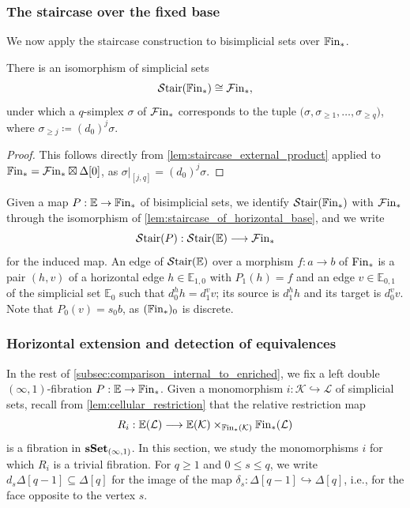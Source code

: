 \documentclass[10pt,reqno]{amsart}
\begin{document}
\subsubsection{The staircase over the fixed base}

We now apply the staircase construction to bisimplicial sets over
$\mathbb{F}\mathrm{in}_*$.

\begin{lemma}
\label{lem:staircase_of_horizontal_base}
There is an isomorphism of simplicial sets
\[
\mathcal{S}\mathrm{tair}(\mathbb{F}\mathrm{in}_*)\cong \mathcal{F}\mathrm{in}_*,
\]
under which a $q$-simplex $\sigma$ of $\mathcal{F}\mathrm{in}_*$ corresponds to
the tuple
$
\bigl(
\sigma,\sigma_{\geq1},\ldots,\sigma_{\geq q}
\bigr)
$,
where $\sigma_{\geq j}\coloneqq(d_0)^j\sigma$.
\end{lemma}

\begin{proof}
This follows directly from \cref{lem:staircase_external_product}
applied to $\mathbb{F}\mathrm{in}_*=\mathcal{F}\mathrm{in}_*\boxtimes\Delta[0]$, as
$\sigma|_{[j,q]}=(d_0)^j\sigma$.
\end{proof}

Given a map $P:\mathbb E\to\mathbb{F}\mathrm{in}_*$ of bisimplicial sets, we
identify $\mathcal{S}\mathrm{tair}(\mathbb{F}\mathrm{in}_*)$ with $\mathcal{F}\mathrm{in}_*$ through the isomorphism
of \cref{lem:staircase_of_horizontal_base}, and we write
\[
\mathcal{S}\mathrm{tair}(P):\mathcal{S}\mathrm{tair}(\mathbb E)\longrightarrow \mathcal{F}\mathrm{in}_*
\]
for the induced map. An edge of $\mathcal{S}\mathrm{tair}(\mathbb E)$ over a morphism
$f:a\to b$ of $\mathrm{Fin}_*$ is a pair $(h,v)$ of a horizontal edge
$h\in\mathbb E_{1,0}$ with $P_1(h)=f$ and an edge
$v\in\mathbb E_{0,1}$ of the simplicial set $\mathbb E_0$ such
that $d_0^hh=d_1^vv$; its source is $d_1^hh$ and its target is
$d_0^vv$. Note that $P_0(v)=s_0b$, as $(\mathbb{F}\mathrm{in}_*)_0$ is
discrete.


\subsubsection{Horizontal extension and detection of equivalences}
\label{subsubsec:horizontal_left_extension_converse}

In the rest of \cref{subsec:comparison_internal_to_enriched}, we fix a
left double $(\infty,1)$-fibration $P:\mathbb E\to\mathbb{F}\mathrm{in}_*$. Given
a monomorphism
$i:\mathcal K\hookrightarrow \mathcal L$ of simplicial sets, recall
from \cref{lem:cellular_restriction} that the relative restriction map
\[
R_i:
\mathbb E(\mathcal L)
\longrightarrow
\mathbb E(\mathcal K)\times_{\mathbb{F}\mathrm{in}_*(\mathcal K)}\mathbb{F}\mathrm{in}_*(\mathcal L)
\]
is a fibration in $\mathbf{sSet}_{(\infty,1)}$. In this section, we study
the monomorphisms $i$ for which $R_i$ is a trivial fibration. For
$q\geq1$ and $0\leq s\leq q$, we write
$d_s\Delta[q-1]\subseteq\Delta[q]$ for the image of the map
$\delta_s:\Delta[q-1]\hookrightarrow\Delta[q]$, i.e., for the face
opposite to the vertex $s$.
\end{document}
